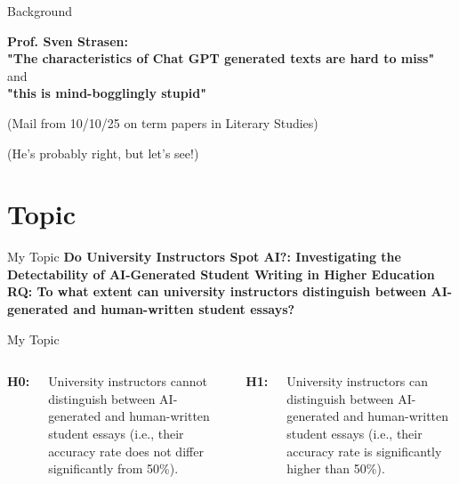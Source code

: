 \documentclass[14pt, aspectratio=169]{beamer}
\begin{document}
\begin{frame}{Background}
    \begin{center}
    \textbf{Prof. Sven Strasen:}\\
    \vspace{0.5cm}
    \pause
    \textbf{"The characteristics of Chat GPT generated texts are hard to miss"} \\
    \pause
    and \\
    \pause
    \textbf{"this is mind-bogglingly stupid"}\\
    \pause
    \vspace{0.5cm}
    \begin{tiny}
    (Mail from 10/10/25 on term papers in Literary Studies)\\
    \end{tiny}
    \vspace{0.5cm}
    \begin{small}
    (He's probably right, but let's see!)
    \end{small}
    \end{center}
\end{frame}


\section{Topic}
\begin{frame}{My Topic}
    \pause
  \textbf{Do University Instructors Spot AI?: Investigating the Detectability of AI-Generated Student Writing in Higher Education}\\
    \pause
  \vspace {0.5cm}
  \textbf{RQ: To what extent can university instructors distinguish between AI-generated and human-written student essays?}
\end{frame}

\begin{frame}{My Topic}
  \begin{columns}[T]
    \textbf{H0:}\\
    \begin{small}
      University instructors cannot distinguish between AI-generated and human-written student essays (i.e., their accuracy rate does not differ significantly from 50\%).
    \end{small}
    \textbf{H1:}\\
    \begin{small}
      University instructors can distinguish between AI-generated and human-written student essays (i.e., their accuracy rate is significantly higher than 50\%).
    \end{small}
  \end{columns}
\end{frame}
\end{document}
